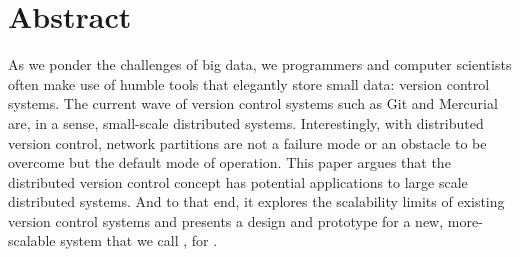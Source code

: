\chapter{Abstract}


As we ponder the challenges of big data, we programmers and computer scientists
often make use of humble tools that elegantly store small data: version control
systems. The current wave of version control systems such as Git and Mercurial
are, in a sense, small-scale distributed systems. Interestingly, with
distributed version control, network partitions are not a failure mode or an
obstacle to be overcome but the default mode of operation. This paper argues
that the distributed version control concept has potential applications to large
scale distributed systems. And to that end, it explores the scalability limits
of existing version control systems and presents a design and prototype for a
new, more-scalable system that we call , for .
